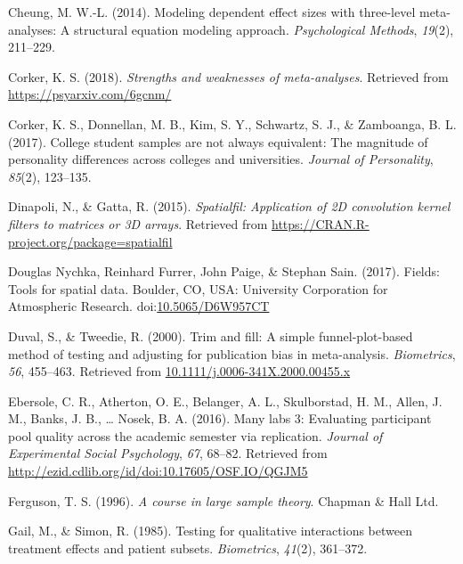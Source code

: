 \documentclass[english,,man]{apa6}
\begin{document}
\leavevmode\hypertarget{ref-Cheung:2014}{}%
Cheung, M. W.-L. (2014). Modeling dependent effect sizes with three-level meta-analyses: A structural equation modeling approach. \emph{Psychological Methods}, \emph{19}(2), 211--229.

\leavevmode\hypertarget{ref-Corker:2018}{}%
Corker, K. S. (2018). \emph{Strengths and weaknesses of meta-analyses}. Retrieved from \url{https://psyarxiv.com/6gcnm/}

\leavevmode\hypertarget{ref-Corker:etal:2017}{}%
Corker, K. S., Donnellan, M. B., Kim, S. Y., Schwartz, S. J., \& Zamboanga, B. L. (2017). College student samples are not always equivalent: The magnitude of personality differences across colleges and universities. \emph{Journal of Personality}, \emph{85}(2), 123--135.

\leavevmode\hypertarget{ref-R-spatialfil}{}%
Dinapoli, N., \& Gatta, R. (2015). \emph{Spatialfil: Application of 2D convolution kernel filters to matrices or 3D arrays}. Retrieved from \url{https://CRAN.R-project.org/package=spatialfil}

\leavevmode\hypertarget{ref-R-fields}{}%
Douglas Nychka, Reinhard Furrer, John Paige, \& Stephan Sain. (2017). Fields: Tools for spatial data. Boulder, CO, USA: University Corporation for Atmospheric Research. doi:\href{https://doi.org/10.5065/D6W957CT}{10.5065/D6W957CT}

\leavevmode\hypertarget{ref-Duval:Tweedie:2000}{}%
Duval, S., \& Tweedie, R. (2000). Trim and fill: A simple funnel-plot-based method of testing and adjusting for publication bias in meta-analysis. \emph{Biometrics}, \emph{56}, 455--463. Retrieved from \url{10.1111/j.0006-341X.2000.00455.x}

\leavevmode\hypertarget{ref-Ebersole:etal:2016}{}%
Ebersole, C. R., Atherton, O. E., Belanger, A. L., Skulborstad, H. M., Allen, J. M., Banks, J. B., \ldots{} Nosek, B. A. (2016). Many labs 3: Evaluating participant pool quality across the academic semester via replication. \emph{Journal of Experimental Social Psychology}, \emph{67}, 68--82. Retrieved from \url{http://ezid.cdlib.org/id/doi:10.17605/OSF.IO/QGJM5}

\leavevmode\hypertarget{ref-Ferguson:1996}{}%
Ferguson, T. S. (1996). \emph{A course in large sample theory}. Chapman \& Hall Ltd.

\leavevmode\hypertarget{ref-Gail:Simon:1985}{}%
Gail, M., \& Simon, R. (1985). Testing for qualitative interactions between treatment effects and patient subsets. \emph{Biometrics}, \emph{41}(2), 361--372.
\end{document}
